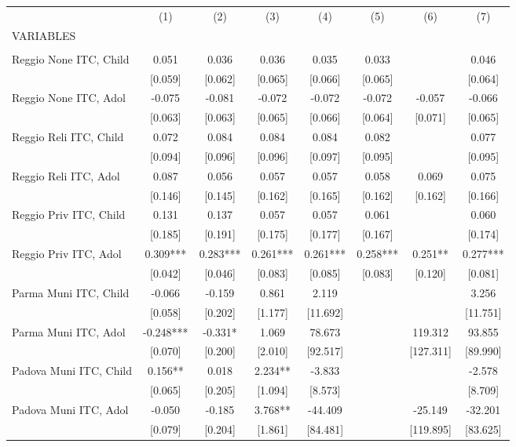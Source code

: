 \begin{tabular}{lccccccc} \hline
 & (1) & (2) & (3) & (4) & (5) & (6) & (7) \\
VARIABLES &  &  &  &  &  &  &  \\ \hline
 &  &  &  &  &  &  &  \\
Reggio None ITC, Child & 0.051 & 0.036 & 0.036 & 0.035 & 0.033 &  & 0.046 \\
 & [0.059] & [0.062] & [0.065] & [0.066] & [0.065] &  & [0.064] \\
Reggio None ITC, Adol & -0.075 & -0.081 & -0.072 & -0.072 & -0.072 & -0.057 & -0.066 \\
 & [0.063] & [0.063] & [0.065] & [0.066] & [0.064] & [0.071] & [0.065] \\
Reggio Reli ITC, Child & 0.072 & 0.084 & 0.084 & 0.084 & 0.082 &  & 0.077 \\
 & [0.094] & [0.096] & [0.096] & [0.097] & [0.095] &  & [0.095] \\
Reggio Reli ITC, Adol & 0.087 & 0.056 & 0.057 & 0.057 & 0.058 & 0.069 & 0.075 \\
 & [0.146] & [0.145] & [0.162] & [0.165] & [0.162] & [0.162] & [0.166] \\
Reggio Priv ITC, Child & 0.131 & 0.137 & 0.057 & 0.057 & 0.061 &  & 0.060 \\
 & [0.185] & [0.191] & [0.175] & [0.177] & [0.167] &  & [0.174] \\
Reggio Priv ITC, Adol & 0.309*** & 0.283*** & 0.261*** & 0.261*** & 0.258*** & 0.251** & 0.277*** \\
 & [0.042] & [0.046] & [0.083] & [0.085] & [0.083] & [0.120] & [0.081] \\
Parma Muni ITC, Child & -0.066 & -0.159 & 0.861 & 2.119 &  &  & 3.256 \\
 & [0.058] & [0.202] & [1.177] & [11.692] &  &  & [11.751] \\
Parma Muni ITC, Adol & -0.248*** & -0.331* & 1.069 & 78.673 &  & 119.312 & 93.855 \\
 & [0.070] & [0.200] & [2.010] & [92.517] &  & [127.311] & [89.990] \\
Padova Muni ITC, Child & 0.156** & 0.018 & 2.234** & -3.833 &  &  & -2.578 \\
 & [0.065] & [0.205] & [1.094] & [8.573] &  &  & [8.709] \\
Padova Muni ITC, Adol & -0.050 & -0.185 & 3.768** & -44.409 &  & -25.149 & -32.201 \\
 & [0.079] & [0.204] & [1.861] & [84.481] &  & [119.895] & [83.625] \\

\end{tabular}
